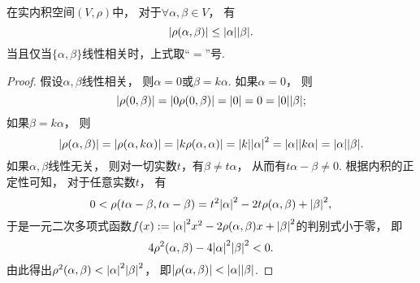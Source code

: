 \begin{theorem}
在实内积空间\((V,\rho)\)中，
对于\(\forall \alpha,\beta \in V\)，
有\begin{equation}
	\abs{\rho(\alpha,\beta)} \leq \abs{\alpha} \abs{\beta}.
\end{equation}
当且仅当\(\{\alpha,\beta\}\)线性相关时，上式取“\(=\)”号.
\begin{proof}
假设\(\alpha,\beta\)线性相关，
则\(\alpha = 0\)或\(\beta = k \alpha\).
如果\(\alpha = 0\)，
则\begin{equation*}
	\abs{\rho(0,\beta)}
	= \abs{0 \rho(0,\beta)}
	= \abs{0}
	= 0
	= \abs{0} \abs{\beta};
\end{equation*}
如果\(\beta = k \alpha\)，
则\begin{equation*}
	\abs{\rho(\alpha,\beta)}
	= \abs{\rho(\alpha,k \alpha)}
	= \abs{k \rho(\alpha,\alpha)}
	= \abs{k} \abs{\alpha}^2
	= \abs{\alpha} \abs{k \alpha}
	= \abs{\alpha} \abs{\beta}.
\end{equation*}
如果\(\alpha,\beta\)线性无关，
则对一切实数\(t\)，有\(\beta \neq t \alpha\)，
从而有\(t \alpha - \beta \neq 0\).
根据内积的正定性可知，
对于任意实数\(t\)，
有\begin{equation*}
	0 < \rho(t \alpha - \beta, t \alpha - \beta)
	= t^2 \abs{\alpha}^2
	- 2t \rho(\alpha,\beta)
	+ \abs{\beta}^2,
\end{equation*}
于是一元二次多项式函数\(
	f(x)
	:=
	\abs{\alpha}^2 x^2
	- 2 \rho(\alpha,\beta) x
	+ \abs{\beta}^2
\)的判别式小于零，
即\begin{equation*}
	4 \rho^2(\alpha,\beta)
	- 4 \abs{\alpha}^2 \abs{\beta}^2
	< 0.
\end{equation*}
由此得出\(
	\rho^2(\alpha,\beta)
	< \abs{\alpha}^2 \abs{\beta}^2
\)，
即\(
	\abs{\rho(\alpha,\beta)}
	< \abs{\alpha} \abs{\beta}
\).
\end{proof}
\end{theorem}

